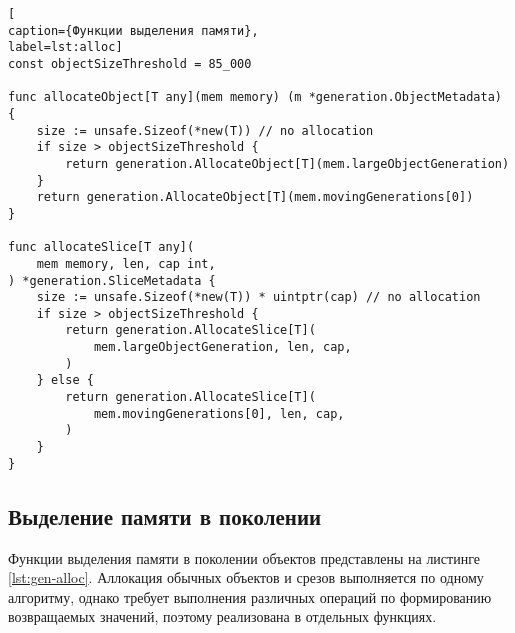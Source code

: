 \begin{lstlisting}[
caption={Функции выделения памяти},
label=lst:alloc]
const objectSizeThreshold = 85_000

func allocateObject[T any](mem memory) (m *generation.ObjectMetadata) {
	size := unsafe.Sizeof(*new(T)) // no allocation
	if size > objectSizeThreshold {
		return generation.AllocateObject[T](mem.largeObjectGeneration)
	}
	return generation.AllocateObject[T](mem.movingGenerations[0])
}

func allocateSlice[T any](
	mem memory, len, cap int,
) *generation.SliceMetadata {
	size := unsafe.Sizeof(*new(T)) * uintptr(cap) // no allocation
	if size > objectSizeThreshold {
		return generation.AllocateSlice[T](
			mem.largeObjectGeneration, len, cap,
		)
	} else {
		return generation.AllocateSlice[T](
			mem.movingGenerations[0], len, cap,
		)
	}
}
\end{lstlisting}



\subsection*{Выделение памяти в поколении}

Функции выделения памяти в поколении объектов представлены на листинге \ref{lst:gen-alloc}. Аллокация обычных объектов и срезов выполняется по одному алгоритму, однако требует выполнения различных операций по формированию возвращаемых значений, поэтому реализована в отдельных функциях.

